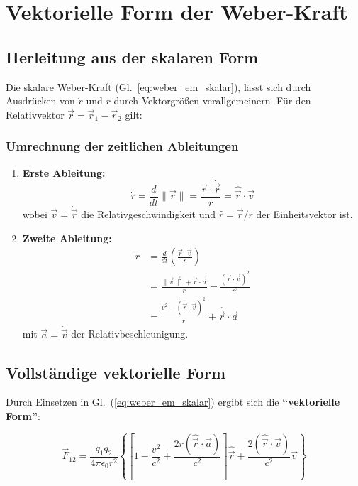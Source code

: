 \section{Vektorielle Form der Weber-Kraft}
\subsection{Herleitung aus der skalaren Form}

Die skalare Weber-Kraft (Gl.~\ref{eq:weber_em_skalar}), lässt sich durch Ausdrücken von $\dot{r}$ und $\ddot{r}$ durch Vektorgrößen verallgemeinern.
Für den Relativvektor $\vec{r} = \vec{r}_1 - \vec{r}_2$ gilt:

\subsubsection{Umrechnung der zeitlichen Ableitungen}
\begin{enumerate}
\item \textbf{Erste Ableitung:}
\begin{equation}
\dot{r} = \frac{d}{dt}\|\vec{r}\| = \frac{\vec{r} \cdot \dot{\vec{r}}}{r} = \hat{\vec{r}} \cdot \vec{v}
\end{equation}
wobei $\vec{v} = \dot{\vec{r}}$ die Relativgeschwindigkeit und $\hat{r} = \vec{r}/r$ der Einheitsvektor ist.

\item \textbf{Zweite Ableitung:}
\begin{align}
\ddot{r} &= \frac{d}{dt}\left(\frac{\vec{r} \cdot \vec{v}}{r}\right) \nonumber \\
&= \frac{\|\vec{v}\|^2 + \vec{r} \cdot \vec{a}}{r} - \frac{(\vec{r} \cdot \vec{v})^2}{r^3} \nonumber \\
&= \frac{v^2 - (\hat{\vec{r}} \cdot \vec{v})^2}{r} + \hat{\vec{r}} \cdot \vec{a}
\end{align}
mit $\vec{a} = \dot{\vec{v}}$ der Relativbeschleunigung.
\end{enumerate}

\subsection{Vollständige vektorielle Form}
Durch Einsetzen in Gl.~(\ref{eq:weber_em_skalar}) ergibt sich die \textbf{\enquote{vektorielle Form}}:

\begin{equation}
\vec{F}_{12} = \frac{q_1 q_2}{4\pi\epsilon_0 r^2} \left\{
\left[1 - \frac{v^2}{c^2} + \frac{2r(\hat{\vec{r}} \cdot \vec{a})}{c^2}\right]\hat{\vec{r}} + \frac{2(\hat{\vec{r}} \cdot \vec{v})}{c^2}\vec{v}
\right\}
\label{eq:weber_vector}
\end{equation}

